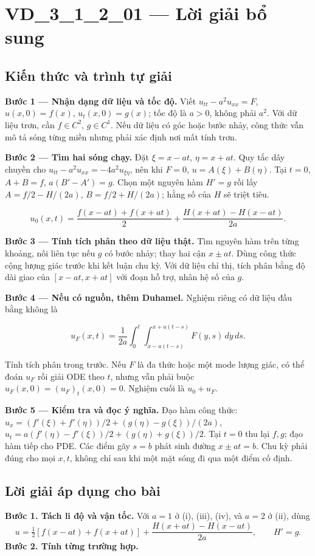 \documentclass[10pt,a4paper]{article}
\begin{document}
\section*{VD\_3\_1\_2\_01 — Lời giải bổ sung}
\subsection*{Kiến thức và trình tự giải}
\textbf{Bước 1 — Nhận dạng dữ liệu và tốc độ.} Viết $u_{tt}-a^2u_{xx}=F$, $u(x,0)=f(x)$, $u_t(x,0)=g(x)$; tốc độ là $a>0$, không phải $a^2$. Với dữ liệu trơn, cần $f\in C^2$, $g\in C^1$. Nếu dữ liệu có góc hoặc bước nhảy, công thức vẫn mô tả sóng từng miền nhưng phải xác định nơi mất tính trơn.

\textbf{Bước 2 — Tìm hai sóng chạy.} Đặt $\xi=x-at$, $\eta=x+at$. Quy tắc dây chuyền cho $u_{tt}-a^2u_{xx}=-4a^2u_{\xi\eta}$, nên khi $F=0$, $u=A(\xi)+B(\eta)$. Tại $t=0$, $A+B=f$, $a(B'-A')=g$. Chọn một nguyên hàm $H'=g$ rồi lấy $A=f/2-H/(2a)$, $B=f/2+H/(2a)$; hằng số của $H$ sẽ triệt tiêu.


\[
u_0(x,t)=\frac{f(x-at)+f(x+at)}2+\frac{H(x+at)-H(x-at)}{2a}.
\]


\textbf{Bước 3 — Tính tích phân theo dữ liệu thật.} Tìm nguyên hàm trên từng khoảng, nối liên tục nếu $g$ có bước nhảy; thay hai cận $x\pm at$. Dùng công thức cộng lượng giác trước khi kết luận chu kỳ. Với dữ liệu chỉ thị, tích phân bằng độ dài giao của $[x-at,x+at]$ với đoạn hỗ trợ, nhân hệ số của $g$.

\textbf{Bước 4 — Nếu có nguồn, thêm Duhamel.} Nghiệm riêng có dữ liệu đầu bằng không là


\[
u_F(x,t)=\frac1{2a}\int_0^t\int_{x-a(t-s)}^{x+a(t-s)}F(y,s)\,dy\,ds.
\]


Tính tích phân trong trước. Nếu $F$ là đa thức hoặc một mode lượng giác, có thể đoán $u_F$ rồi giải ODE theo $t$, nhưng vẫn phải buộc $u_F(x,0)=(u_F)_t(x,0)=0$. Nghiệm cuối là $u_0+u_F$.

\textbf{Bước 5 — Kiểm tra và đọc ý nghĩa.} Đạo hàm công thức: $u_x=(f'(\xi)+f'(\eta))/2+(g(\eta)-g(\xi))/(2a)$, $u_t=a(f'(\eta)-f'(\xi))/2+(g(\eta)+g(\xi))/2$. Tại $t=0$ thu lại $f,g$; đạo hàm tiếp cho PDE. Các điểm gãy $s=b$ phát sinh đường $x\pm at=b$. Chu kỳ phải đúng cho mọi $x,t$, không chỉ sau khi một mặt sóng đi qua một điểm cố định.
\subsection*{Lời giải áp dụng cho bài}
\textbf{Bước 1. Tách li độ và vận tốc.} Với $a=1$ ở (i), (iii), (iv), và $a=2$ ở (ii), dùng
\[u=\tfrac12[f(x-at)+f(x+at)]+\frac{H(x+at)-H(x-at)}{2a},\qquad H'=g.\]
\textbf{Bước 2. Tính từng trường hợp.}
\end{document}
